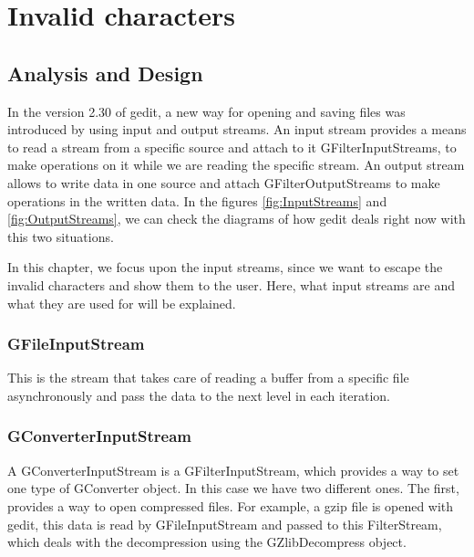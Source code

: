 \chapter{Invalid characters}

\section{Analysis and Design}

In the version 2.30 of gedit, a new way for opening and saving files was introduced by using input and output streams. An input stream provides a means to read a stream from a specific source and attach to it GFilterInputStreams, to make operations on it while we are reading the specific stream. An output stream allows to write data in one source and attach GFilterOutputStreams to make operations in the written data. In the figures \ref{fig:InputStreams} and \ref{fig:OutputStreams}, we can check the diagrams of how gedit deals right now with this two situations.



In this chapter, we focus upon the input streams, since we want to escape the invalid characters and show them to the user. Here,
what input streams are and what they are used for will be explained.


\subsection*{GFileInputStream}

This is the stream that takes care of reading a buffer from a specific file asynchronously and pass the data to the next level in each iteration.

\subsection*{GConverterInputStream}

A GConverterInputStream is a GFilterInputStream, which provides a way to set one type of GConverter object. In this case we have two different ones. The first, provides a way to open compressed files. For example,  a gzip file is opened with gedit, this data is read by GFileInputStream and passed to this FilterStream,  which deals with the decompression using the GZlibDecompress object.

